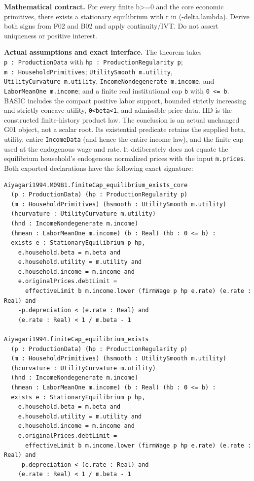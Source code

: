 \documentclass[
  11pt,
]{article}
\let\LedgerOriginalTexttt\texttt
\renewcommand{\texttt}[1]{{\small\LedgerOriginalTexttt{#1}}}
\begin{document}
\textbf{Mathematical contract.} For every finite b\textgreater=0 and the
core economic primitives, there exists a stationary equilibrium with r
in (-delta,lambda). Derive both signs from F02 and B02 and apply
continuity/IVT. Do not assert uniqueness or positive interest.

\textbf{Actual assumptions and exact interface.} The theorem takes
\texttt{p\ :\ ProductionData} with
\texttt{hp\ :\ ProductionRegularity\ p};
\texttt{m\ :\ HouseholdPrimitives}; \texttt{UtilitySmooth\ m.utility},
\texttt{UtilityCurvature\ m.utility},
\texttt{IncomeNondegenerate\ m.income}, and
\texttt{LaborMeanOne\ m.income}; and a finite real institutional cap
\texttt{b} with \texttt{0\ \textless{}=\ b}. BASIC includes the compact
positive labor support, bounded strictly increasing and strictly concave
utility, \texttt{0\textless{}beta\textless{}1}, and admissible price
data. IID is the constructed finite-history product law. The conclusion
is an actual unchanged G01 object, not a scalar root. Its existential
predicate retains the supplied beta, utility, entire \texttt{IncomeData}
(and hence the entire income law), and the finite cap used at the
endogenous wage and rate. It deliberately does not equate the
equilibrium household's endogenous normalized prices with the input
\texttt{m.prices}. Both exported declarations have the following exact
signature:

\begin{verbatim}
Aiyagari1994.M09B1.finiteCap_equilibrium_exists_core
  (p : ProductionData) (hp : ProductionRegularity p)
  (m : HouseholdPrimitives) (hsmooth : UtilitySmooth m.utility)
  (hcurvature : UtilityCurvature m.utility)
  (hnd : IncomeNondegenerate m.income)
  (hmean : LaborMeanOne m.income) (b : Real) (hb : 0 <= b) :
  exists e : StationaryEquilibrium p hp,
    e.household.beta = m.beta and
    e.household.utility = m.utility and
    e.household.income = m.income and
    e.originalPrices.debtLimit =
      effectiveLimit b m.income.lower (firmWage p hp e.rate) (e.rate : Real) and
    -p.depreciation < (e.rate : Real) and
    (e.rate : Real) < 1 / m.beta - 1

Aiyagari1994.finiteCap_equilibrium_exists
  (p : ProductionData) (hp : ProductionRegularity p)
  (m : HouseholdPrimitives) (hsmooth : UtilitySmooth m.utility)
  (hcurvature : UtilityCurvature m.utility)
  (hnd : IncomeNondegenerate m.income)
  (hmean : LaborMeanOne m.income) (b : Real) (hb : 0 <= b) :
  exists e : StationaryEquilibrium p hp,
    e.household.beta = m.beta and
    e.household.utility = m.utility and
    e.household.income = m.income and
    e.originalPrices.debtLimit =
      effectiveLimit b m.income.lower (firmWage p hp e.rate) (e.rate : Real) and
    -p.depreciation < (e.rate : Real) and
    (e.rate : Real) < 1 / m.beta - 1
\end{verbatim}
\end{document}
